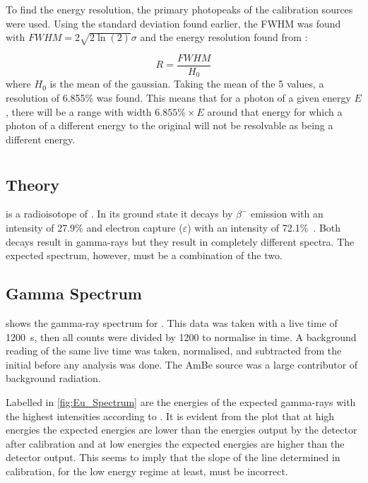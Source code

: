 \documentclass[11pt]{article}
\numberwithin{equation}{section}
\numberwithin{figure}{section}
\numberwithin{table}{section}
\begin{document}
To find the energy resolution, the primary photopeaks of the calibration sources were used. Using the standard deviation found earlier, the FWHM was found with $FWHM=2\sqrt{2\ln(2)}\sigma$ and the energy resolution found from \cite[Fig. 4.5]{Knoll}:

\begin{equation}
    R=\frac{FWHM}{H_0}
    \label{eqn:EnergyResolution}
\end{equation}
where $H_0$ is the mean of the gaussian. Taking the mean of the 5 values, a resolution of 6.855\% was found. This means that for a photon of a given energy $E$, there will be a range with width $6.855\%\times E$ around that energy for which a photon of a different energy to the original will not be resolvable as being a different energy. 

\section{}\label{sec:Eu}

\subsection{ Theory}
 is a radioisotope of . In its ground state it decays by $\beta^-$ emission with an intensity of 27.9\% and electron capture ($\varepsilon$) with an intensity of 72.1\%~\cite{nudat}. Both decays result in gamma-rays but they result in completely different spectra. The expected spectrum, however, must be a combination of the two. 

\subsection{ Gamma Spectrum}
 shows the gamma-ray spectrum for . This data was taken with a live time of \SI{1200}{\second}, then all counts were divided by 1200 to normalise in time. A background reading of the same live time was taken, normalised, and subtracted from the initial before any analysis was done. The AmBe source was a large contributor of background radiation.

Labelled in \cref{fig:Eu_Spectrum} are the energies of the expected gamma-rays with the highest intensities according to \cite{nudat}. It is evident from the plot that at high energies the expected energies are lower than the energies output by the detector after calibration and at low energies the expected energies are higher than the detector output. This seems to imply that the slope of the line determined in calibration, for the low energy regime at least, must be incorrect. 
\end{document}
